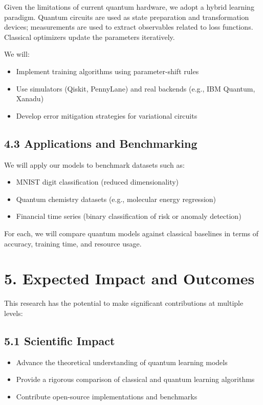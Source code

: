 \documentclass[11pt]{article}
\begin{document}
Given the limitations of current quantum hardware, we adopt a hybrid learning paradigm. Quantum circuits are used as state preparation and transformation devices; measurements are used to extract observables related to loss functions. Classical optimizers update the parameters iteratively.

We will:
\begin{itemize}
    \item Implement training algorithms using parameter-shift rules
    \item Use simulators (Qiskit, PennyLane) and real backends (e.g., IBM Quantum, Xanadu)
    \item Develop error mitigation strategies for variational circuits
\end{itemize}

\subsection*{4.3 Applications and Benchmarking}

We will apply our models to benchmark datasets such as:
\begin{itemize}
    \item MNIST digit classification (reduced dimensionality)
    \item Quantum chemistry datasets (e.g., molecular energy regression)
    \item Financial time series (binary classification of risk or anomaly detection)
\end{itemize}

For each, we will compare quantum models against classical baselines in terms of accuracy, training time, and resource usage.

\section*{5. Expected Impact and Outcomes}

This research has the potential to make significant contributions at multiple levels:

\subsection*{5.1 Scientific Impact}
\begin{itemize}
    \item Advance the theoretical understanding of quantum learning models
    \item Provide a rigorous comparison of classical and quantum learning algorithms
    \item Contribute open-source implementations and benchmarks
\end{itemize}
\end{document}
